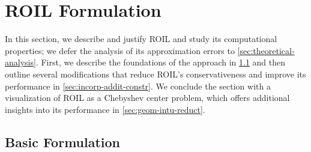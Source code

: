 \documentclass[10pt]{article}
\theoremstyle{plain}
\theoremstyle{remark}
\begin{document}


\section{ROIL Formulation}\label{sec:optimization-formulation}


In this section, we describe and justify ROIL and study its computational properties; we defer the analysis of its approximation errors to \cref{sec:theoretical-analysis}. First, we describe the foundations of the approach in \cref{sec:basic-formulation} and then outline several modifications that reduce ROIL's conservativeness and improve its performance in \cref{sec:incorp-addit-constr}. We conclude the section with a visualization of ROIL as a Chebyshev center problem, which offers additional insights into its performance in \cref{sec:geom-intu-reduct}.  


\subsection{Basic Formulation}
\label{sec:basic-formulation}
\end{document}
